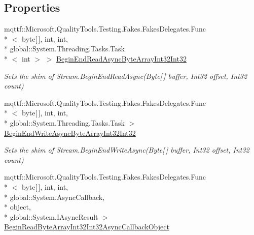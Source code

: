 \subsection*{Properties}
\begin{DoxyCompactItemize}
\item 
mqttf\-::\-Microsoft.\-Quality\-Tools.\-Testing.\-Fakes.\-Fakes\-Delegates.\-Func\\*
$<$ byte\mbox{[}$\,$\mbox{]}, int, int, \\*
global\-::\-System.\-Threading.\-Tasks.\-Task\\*
$<$ int $>$ $>$ \hyperlink{class_system_1_1_i_o_1_1_fakes_1_1_shim_stream_a164c87b4d52013f982b42630a8af5a48}{Begin\-End\-Read\-Async\-Byte\-Array\-Int32\-Int32}
\begin{DoxyCompactList}\small\item\em Sets the shim of Stream.\-Begin\-End\-Read\-Async(\-Byte\mbox{[}$\,$\mbox{]} buffer, Int32 offset, Int32 count)\end{DoxyCompactList}\item 
mqttf\-::\-Microsoft.\-Quality\-Tools.\-Testing.\-Fakes.\-Fakes\-Delegates.\-Func\\*
$<$ byte\mbox{[}$\,$\mbox{]}, int, int, \\*
global\-::\-System.\-Threading.\-Tasks.\-Task $>$ \hyperlink{class_system_1_1_i_o_1_1_fakes_1_1_shim_stream_a1a1ea640d06934cb53d62167bf2cb2c2}{Begin\-End\-Write\-Async\-Byte\-Array\-Int32\-Int32}
\begin{DoxyCompactList}\small\item\em Sets the shim of Stream.\-Begin\-End\-Write\-Async(\-Byte\mbox{[}$\,$\mbox{]} buffer, Int32 offset, Int32 count)\end{DoxyCompactList}\item 
mqttf\-::\-Microsoft.\-Quality\-Tools.\-Testing.\-Fakes.\-Fakes\-Delegates.\-Func\\*
$<$ byte\mbox{[}$\,$\mbox{]}, int, int, \\*
global\-::\-System.\-Async\-Callback, \\*
object, \\*
global\-::\-System.\-I\-Async\-Result $>$ \hyperlink{class_system_1_1_i_o_1_1_fakes_1_1_shim_stream_a46d20bad73d84e2c1582171a371b3686}{Begin\-Read\-Byte\-Array\-Int32\-Int32\-Async\-Callback\-Object}

\end{DoxyCompactItemize}
